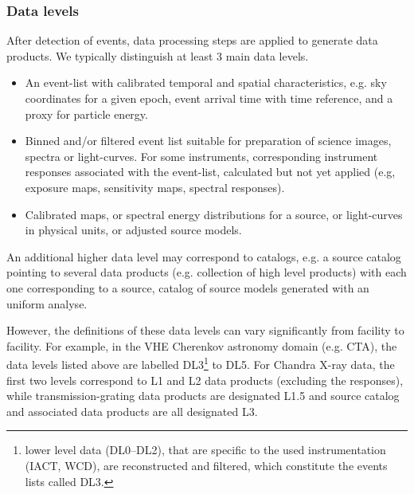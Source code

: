 \documentclass[11pt,a4paper]{ivoa}
\begin{document}



\subsubsection{Data levels}\label{sec:datalevels}

After detection of events, data processing steps are applied to generate data products. We typically distinguish at least 3 main data levels.

\begin{itemize}
    \item[1] An event-list with calibrated temporal and spatial characteristics, e.g. sky coordinates for a given epoch, event arrival time with time reference, and a proxy for particle energy.
    \item[2] Binned and/or filtered event list suitable for preparation of science images, spectra or light-curves.  For some instruments, corresponding instrument responses associated with the event-list, calculated but not yet applied (e.g, exposure maps, sensitivity maps, spectral responses).
    \item[3] Calibrated maps, or spectral energy distributions for a source, or light-curves in physical units, or adjusted source models.
\end{itemize}

An additional higher data level may correspond to catalogs, e.g. a source catalog pointing to several data products (e.g. collection of high level products) with each one corresponding to a source, catalog of source models generated with an uniform analyse.

However, the definitions of these data levels can vary significantly from facility to facility. For example, in the VHE Cherenkov astronomy domain (e.g. CTA), the data levels listed above are labelled DL3\footnote{lower
level data (DL0--DL2), that are specific to the used instrumentation (IACT, WCD), are reconstructed and filtered, which
constitute the events lists called DL3.} to DL5. For Chandra X-ray data, the first two levels correspond  to L1 and L2 data products (excluding the responses), while transmission-grating data products are designated L1.5 and source catalog and associated data products are all designated L3.
\end{document}
